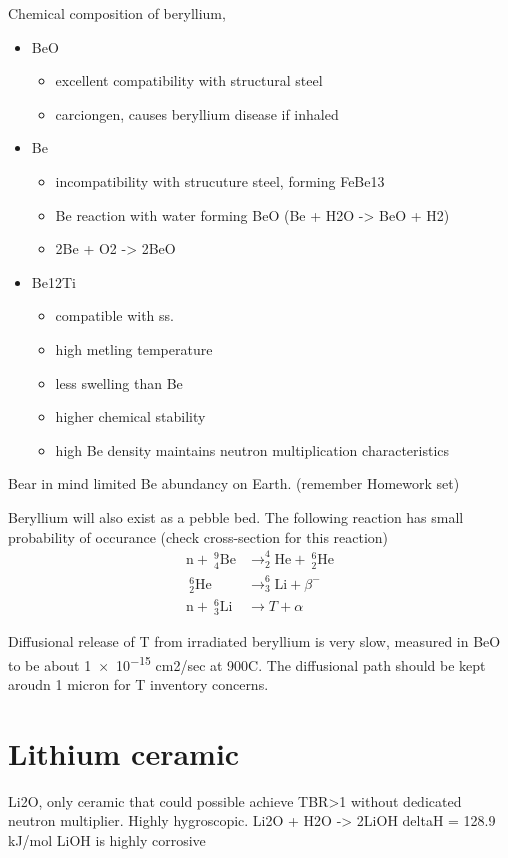 \documentclass[11pt]{report} %
\begin{document}
Chemical composition of beryllium,
\begin{itemize}
\item{BeO}
\begin{itemize}
\item{excellent compatibility with structural steel}
\item{carciongen, causes beryllium disease if inhaled}
\end{itemize}
\item{Be}
\begin{itemize}
\item{incompatibility with strucuture steel, forming FeBe13}
\item{Be reaction with water forming BeO (Be + H2O -> BeO + H2)}
\item{2Be + O2 -> 2BeO}
\end{itemize}
\item{Be12Ti}
\begin{itemize}
\item{compatible with ss.}
\item{high metling temperature}
\item{less swelling than Be}
\item{higher chemical stability}
\item{high Be density maintains neutron multiplication characteristics}
\end{itemize}
\end{itemize}
Bear in mind limited Be abundancy on Earth. (remember Homework set)

Beryllium will also exist as a pebble bed. The following reaction has small probability of occurance (check cross-section for this reaction)
\begin{align}
\mathrm{n} + ~^9_4\mathrm{Be} &\xrightarrow ~ ^4_2\mathrm{He} + ~^6_2\mathrm{He}\\
~^6_2\mathrm{He} &\xrightarrow ~ ^6_3\mathrm{Li} + \beta^-\\
\mathrm{n} + ~^6_3\mathrm{Li} &\xrightarrow ~ T + \alpha
\end{align}

Diffusional release of T from irradiated beryllium is very slow, measured in BeO to be about \num{1e-15} cm2/sec at 900C. The diffusional path should be kept aroudn 1 micron for T inventory concerns.

\section{Lithium ceramic}
Li2O, only ceramic that could possible achieve TBR>1 without dedicated neutron multiplier. Highly hygroscopic.
Li2O + H2O -> 2LiOH deltaH = 128.9 kJ/mol
LiOH is highly corrosive
\end{document}
